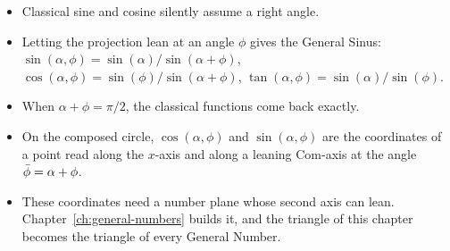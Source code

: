 \begin{plainwords}
\begin{itemize}
  \item Classical sine and cosine silently assume a right angle.
  \item Letting the projection lean at an angle $\phi$ gives the General Sinus: $\sin(\alpha, \phi) = \sin(\alpha)/\sin(\alpha + \phi)$, $\cos(\alpha, \phi) = \sin(\phi)/\sin(\alpha + \phi)$, $\tan(\alpha, \phi) = \sin(\alpha)/\sin(\phi)$.
  \item When $\alpha + \phi = \pi/2$, the classical functions come back exactly.
  \item On the composed circle, $\cos(\alpha, \phi)$ and $\sin(\alpha, \phi)$ are the coordinates of a point read along the $x$-axis and along a leaning Com-axis at the angle $\bar{\phi} = \alpha + \phi$.
  \item These coordinates need a number plane whose second axis can lean. Chapter~\ref{ch:general-numbers} builds it, and the triangle of this chapter becomes the triangle of every General Number.
\end{itemize}
\end{plainwords}
